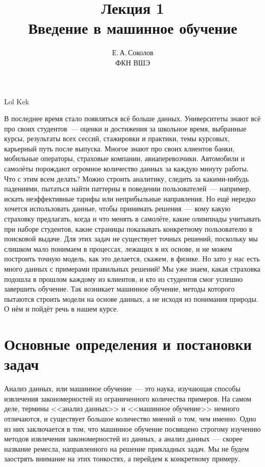 \documentclass[12pt,fleqn]{article}
\begin{document}
\title{Лекция 1\\Введение в машинное обучение}
\author{Е.\,А.\,Соколов\\ФКН ВШЭ}
\maketitle

Lol
Kek

В последнее время стало появляться всё больше данных.
Университеты знают всё про своих студентов~--- оценки и достижения за школьное время,
выбранные курсы, результаты всех сессий, стажировки и практики, темы курсовых,
карьерный путь после выпуска.
Многое знают про своих клиентов банки, мобильные операторы, страховые компании, авиаперевозчики.
Автомобили и самолёты порождают огромное количество данных за каждую минуту работы.
Что с этим всем делать?
Можно строить аналитику, следить за какими-нибудь падениями, пытаться найти паттерны в поведении
пользователей~--- например, искать неэффективные тарифы или неприбыльные направления.
Но ещё нередко хочется использовать данные, чтобы принимать решения~--- кому какую страховку предлагать,
когда и что менять в самолёте, какие олимпиады учитывать при наборе студентов,
какие страницы показывать конкретному пользователю в поисковой выдаче.
Для этих задач не существует точных решений, поскольку мы слишком мало понимаем в процессах,
лежащих в их основе, и не можем построить точную модель, как это делается, скажем, в физике.
Но зато у нас есть много данных с примерами правильных решений!
Мы уже знаем, какая страховка подошла в прошлом каждому из клиентов,
и кто из студентов смог успешно завершить обучение.
Так возникает машинное обучение, методы которого пытаются строить модели
на основе данных, а не исходя из понимания природы.
О нём и пойдёт речь в нашем курсе.

\section{Основные определения и постановки задач}
Анализ данных, или машинное обучение~--- это наука, изучающая способы извлечения закономерностей
из ограниченного количества примеров.
На самом деле, термины <<анализ данных>> и <<машинное обучение>> немного отличаются, и существует большое
количество мнений о том, чем именно.
Одно из них заключается в том, что машинное обучение посвящено строгому
изучению методов извлечения закономерностей из данных,
а анализ данных~--- скорее название ремесла, направленного на решение прикладных задач.
Мы не будем заострять внимание на этих тонкостях, а перейдем к конкретному примеру.
\end{document}
